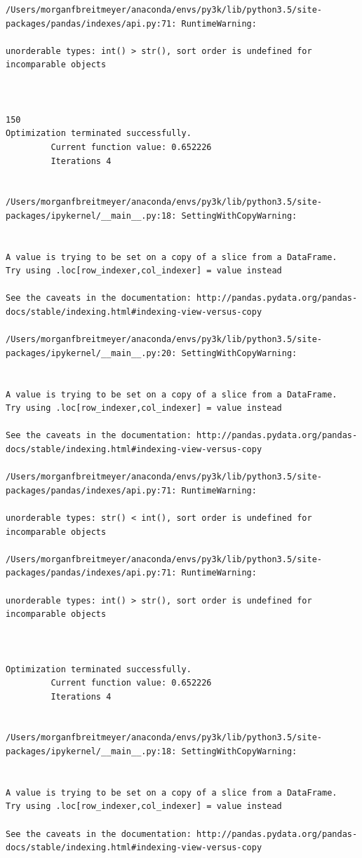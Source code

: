 \begin{lstlisting}
/Users/morganfbreitmeyer/anaconda/envs/py3k/lib/python3.5/site-packages/pandas/indexes/api.py:71: RuntimeWarning:

unorderable types: int() > str(), sort order is undefined for incomparable objects



150
Optimization terminated successfully.
         Current function value: 0.652226
         Iterations 4


/Users/morganfbreitmeyer/anaconda/envs/py3k/lib/python3.5/site-packages/ipykernel/__main__.py:18: SettingWithCopyWarning:


A value is trying to be set on a copy of a slice from a DataFrame.
Try using .loc[row_indexer,col_indexer] = value instead

See the caveats in the documentation: http://pandas.pydata.org/pandas-docs/stable/indexing.html#indexing-view-versus-copy

/Users/morganfbreitmeyer/anaconda/envs/py3k/lib/python3.5/site-packages/ipykernel/__main__.py:20: SettingWithCopyWarning:


A value is trying to be set on a copy of a slice from a DataFrame.
Try using .loc[row_indexer,col_indexer] = value instead

See the caveats in the documentation: http://pandas.pydata.org/pandas-docs/stable/indexing.html#indexing-view-versus-copy

/Users/morganfbreitmeyer/anaconda/envs/py3k/lib/python3.5/site-packages/pandas/indexes/api.py:71: RuntimeWarning:

unorderable types: str() < int(), sort order is undefined for incomparable objects

/Users/morganfbreitmeyer/anaconda/envs/py3k/lib/python3.5/site-packages/pandas/indexes/api.py:71: RuntimeWarning:

unorderable types: int() > str(), sort order is undefined for incomparable objects



Optimization terminated successfully.
         Current function value: 0.652226
         Iterations 4


/Users/morganfbreitmeyer/anaconda/envs/py3k/lib/python3.5/site-packages/ipykernel/__main__.py:18: SettingWithCopyWarning:


A value is trying to be set on a copy of a slice from a DataFrame.
Try using .loc[row_indexer,col_indexer] = value instead

See the caveats in the documentation: http://pandas.pydata.org/pandas-docs/stable/indexing.html#indexing-view-versus-copy


\end{lstlisting}
